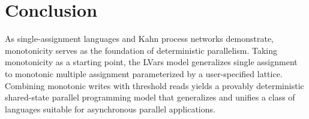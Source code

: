 \section{Conclusion}\label{s:lvars-conclusion}


As single-assignment languages and Kahn process networks demonstrate,
monotonicity serves as the foundation of deterministic parallelism.
Taking monotonicity as a starting point, the LVars model generalizes
single assignment to monotonic multiple assignment parameterized by a
user-specified lattice.  Combining monotonic writes with threshold
reads yields a provably deterministic shared-state parallel
programming model that generalizes and unifies a class of languages
suitable for asynchronous parallel applications.
